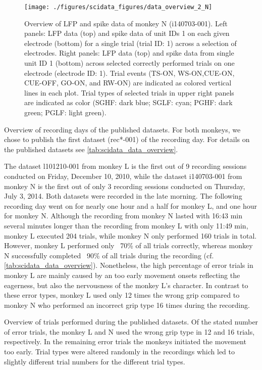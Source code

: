 \begin{figure}
 \centering
 \texttt{[image: ./figures/scidata\_figures/data\_overview\_2\_N]}
 \caption[Overview of LFP and spike data of monkey N (i140703-001)]{Overview of LFP and spike data of monkey N (i140703-001). Left panels: LFP data (top) and spike data of unit IDs 1 on each given electrode (bottom) for a single trial (trial ID: 1) across a selection of electrodes. Right panels: LFP data (top) and spike data from single unit ID 1 (bottom) across selected correctly performed trials on one electrode (electrode ID: 1). Trial events (TS-ON, WS-ON,CUE-ON, CUE-OFF, GO-ON, and RW-ON) are indicated as colored vertical lines in each plot. Trial types of selected trials in upper right panels are indicated as color (SGHF: dark blue; SGLF: cyan; PGHF: dark green; PGLF: light green).}
 \label{fig:overview_data_n_2}
\end{figure}


Overview of recording days of the published datasets. For both monkeys, we chose to publish the first dataset (rec*-001) of the recording day. For details on the published datasets see \cref{tab:scidata_data_overview}.

The dataset l101210-001 from monkey L is the first out of 9 recording sessions conducted on Friday, December 10, 2010, while the dataset i140703-001 from monkey N is the first out of only 3 recording sessions conducted on Thursday, July 3, 2014. Both datasets were recorded in the late morning. The following recording day went on for nearly one hour and a half for monkey L, and one hour for monkey N. Although the recording from monkey N lasted with 16:43 min several minutes longer than the recording from monkey L with only 11:49 min, monkey L executed 204 trials, while monkey N only performed 160 trials in total. However, monkey L performed only ~70\% of all trials correctly, whereas monkey N successfully completed ~90\% of all trials during the recording (cf. \cref{tab:scidata_data_overview}). Nonetheless, the high percentage of error trials in monkey L are mainly caused by an too early movement onsets reflecting the eagerness, but also the nervousness of the monkey L's character. In contrast to these error types, monkey L used only 12 times the wrong grip compared to monkey N who performed an incorrect grip type 16 times during the recording. 

Overview of trials performed during the published datasets. Of the stated number of error trials, the monkey L and N used the wrong grip type in 12 and 16 trials, respectively. In the remaining error trials the monkeys initiated the movement too early. Trial types were altered randomly in the recordings which led to slightly different trial numbers for the different trial types.

